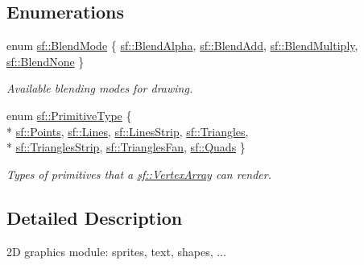 \subsection*{Enumerations}
\begin{DoxyCompactItemize}
\item 
enum \hyperlink{group__graphics_ga80c52fe2f7050d7f7573b7ed3c995388}{sf\+::\+Blend\+Mode} \{ \hyperlink{group__graphics_gga80c52fe2f7050d7f7573b7ed3c995388aaf30f92cf1471a031fce5d61e8674996}{sf\+::\+Blend\+Alpha}, 
\hyperlink{group__graphics_gga80c52fe2f7050d7f7573b7ed3c995388afc35de7c9fe26776b839cfe0027b16da}{sf\+::\+Blend\+Add}, 
\hyperlink{group__graphics_gga80c52fe2f7050d7f7573b7ed3c995388a8adc43071db8f20e508c35e172195234}{sf\+::\+Blend\+Multiply}, 
\hyperlink{group__graphics_gga80c52fe2f7050d7f7573b7ed3c995388abe282fb5f49c20b6439cbec9d4f63722}{sf\+::\+Blend\+None}
 \}
\begin{DoxyCompactList}\small\item\em Available blending modes for drawing. \end{DoxyCompactList}\item 
enum \hyperlink{group__graphics_ga5ee56ac1339984909610713096283b1b}{sf\+::\+Primitive\+Type} \{ \\*
\hyperlink{group__graphics_gga5ee56ac1339984909610713096283b1bac7097d3e01778b9318def1f7ac35a785}{sf\+::\+Points}, 
\hyperlink{group__graphics_gga5ee56ac1339984909610713096283b1ba2bf015eeff9f798dfc3d6d744d669f1e}{sf\+::\+Lines}, 
\hyperlink{group__graphics_gga5ee56ac1339984909610713096283b1ba5b09910f5d0f39641342184ccd0d1de3}{sf\+::\+Lines\+Strip}, 
\hyperlink{group__graphics_gga5ee56ac1339984909610713096283b1ba880a7aa72c20b9f9beb7eb64d2434670}{sf\+::\+Triangles}, 
\\*
\hyperlink{group__graphics_gga5ee56ac1339984909610713096283b1ba66643dbbb24bbacb405973ed80eebae0}{sf\+::\+Triangles\+Strip}, 
\hyperlink{group__graphics_gga5ee56ac1339984909610713096283b1ba5338a2c6d922151fe50f235036af8a20}{sf\+::\+Triangles\+Fan}, 
\hyperlink{group__graphics_gga5ee56ac1339984909610713096283b1ba5041359b76b4bd3d3e6ef738826b8743}{sf\+::\+Quads}
 \}
\begin{DoxyCompactList}\small\item\em Types of primitives that a \hyperlink{classsf_1_1_vertex_array}{sf\+::\+Vertex\+Array} can render. \end{DoxyCompactList}\end{DoxyCompactItemize}


\subsection{Detailed Description}
2\+D graphics module\+: sprites, text, shapes, ... 

